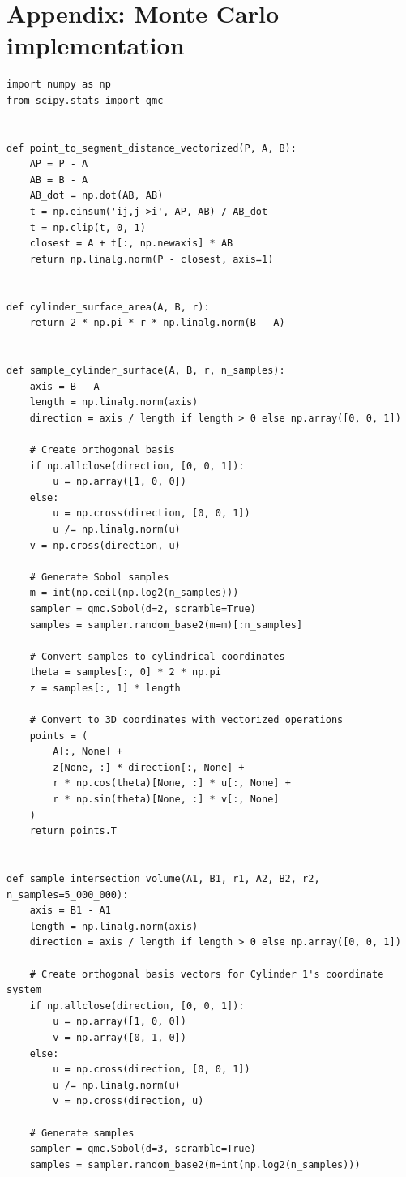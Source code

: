 \documentclass[authoryear]{elsarticle}
\begin{document}
\section*{Appendix: Monte Carlo implementation}
\begin{lstlisting}
import numpy as np
from scipy.stats import qmc


def point_to_segment_distance_vectorized(P, A, B):
    AP = P - A
    AB = B - A
    AB_dot = np.dot(AB, AB)
    t = np.einsum('ij,j->i', AP, AB) / AB_dot
    t = np.clip(t, 0, 1)
    closest = A + t[:, np.newaxis] * AB
    return np.linalg.norm(P - closest, axis=1)


def cylinder_surface_area(A, B, r):
    return 2 * np.pi * r * np.linalg.norm(B - A)


def sample_cylinder_surface(A, B, r, n_samples):
    axis = B - A
    length = np.linalg.norm(axis)
    direction = axis / length if length > 0 else np.array([0, 0, 1])

    # Create orthogonal basis
    if np.allclose(direction, [0, 0, 1]):
        u = np.array([1, 0, 0])
    else:
        u = np.cross(direction, [0, 0, 1])
        u /= np.linalg.norm(u)
    v = np.cross(direction, u)

    # Generate Sobol samples
    m = int(np.ceil(np.log2(n_samples)))
    sampler = qmc.Sobol(d=2, scramble=True)
    samples = sampler.random_base2(m=m)[:n_samples]

    # Convert samples to cylindrical coordinates
    theta = samples[:, 0] * 2 * np.pi
    z = samples[:, 1] * length

    # Convert to 3D coordinates with vectorized operations
    points = (
        A[:, None] +
        z[None, :] * direction[:, None] +
        r * np.cos(theta)[None, :] * u[:, None] +
        r * np.sin(theta)[None, :] * v[:, None]
    )
    return points.T


def sample_intersection_volume(A1, B1, r1, A2, B2, r2, n_samples=5_000_000):
    axis = B1 - A1
    length = np.linalg.norm(axis)
    direction = axis / length if length > 0 else np.array([0, 0, 1])

    # Create orthogonal basis vectors for Cylinder 1's coordinate system
    if np.allclose(direction, [0, 0, 1]):
        u = np.array([1, 0, 0])
        v = np.array([0, 1, 0])
    else:
        u = np.cross(direction, [0, 0, 1])
        u /= np.linalg.norm(u)
        v = np.cross(direction, u)

    # Generate samples
    sampler = qmc.Sobol(d=3, scramble=True)
    samples = sampler.random_base2(m=int(np.log2(n_samples)))


\end{lstlisting}
\end{document}
